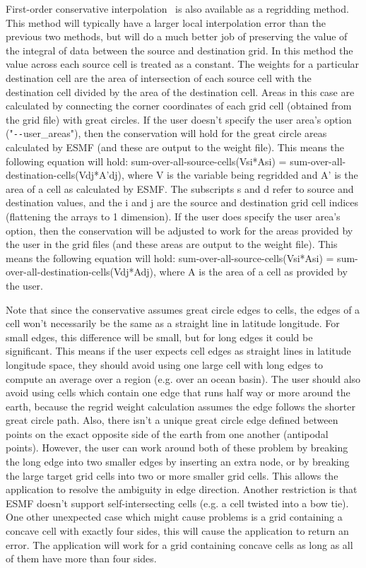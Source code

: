 First-order conservative interpolation~\cite{ConservativeOrder1} is also available as a regridding method. This method will typically have
a larger local interpolation error than the previous two methods, but will do a much better job of preserving the value of the
integral of data between the source and destination grid. In this method the value across each source cell
is treated as a constant. The weights for a particular destination cell are the area of intersection of each
source cell with the destination cell divided by the area of the destination cell.
Areas in this case are calculated by connecting the corner coordinates of each grid cell (obtained from the grid file) with great circles. If the user doesn't specify
the user area's option ("\verb+--+user\_areas"), then the conservation will hold for the great circle areas calculated by
ESMF (and these are output to the weight file). This means the following equation will hold:  sum-over-all-source-cells(Vsi*Asi) = sum-over-all-destination-cells(Vdj*A'dj), where
V is the variable being regridded and A' is the area of a cell as calculated by ESMF.  The subscripts s and d refer to source and destination values, and the i and j are the source
and destination grid cell indices (flattening the arrays to 1 dimension). If the user does specify the user area's option, then the conservation will be adjusted to work for the areas
provided by the user in the grid files (and these areas are output to the weight file). This means the following equation will hold:  sum-over-all-source-cells(Vsi*Asi) = sum-over-all-destination-cells(Vdj*Adj), where A is the area of a cell as provided by the user.

Note that since the conservative assumes great circle edges to cells, the edges of a cell won't necessarily be
the same as a straight line in latitude longitude. For small edges, this difference will be small, but for long edges it could be significant. This means if
the user expects cell edges as straight lines in latitude longitude space, they should avoid using one large cell with long edges to compute an average over a region (e.g. over an ocean basin). The
user should also avoid using cells which contain one edge that runs half way or more around the earth, because the regrid weight calculation assumes the
edge follows the shorter great circle path. Also, there isn't a unique great circle edge defined between points on the exact opposite side of the earth from one another (antipodal points).
However, the user can work around both of these problem by breaking the long edge into two smaller edges by inserting an extra node, or by breaking the large target grid cells into two or more smaller grid cells.
This allows the application to resolve the ambiguity in edge direction. Another restriction is that ESMF doesn't support self-intersecting cells (e.g. a cell twisted into a 
bow tie). One other unexpected case which might cause problems is a grid  containing a concave cell with exactly four sides, this will cause the application to return an error. The application will work for a
grid containing concave cells as long as all of them have more than four sides. 

